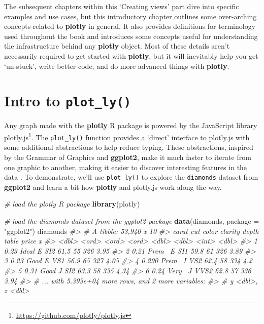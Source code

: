 \documentclass[
  12pt,
]{krantz}
\newenvironment{Shaded}{\begin{snugshade}}{\end{snugshade}}
\newcommand{\CommentTok}[1]{\textcolor[rgb]{0.56,0.35,0.01}{\textit{#1}}}
\newcommand{\DataTypeTok}[1]{\textcolor[rgb]{0.13,0.29,0.53}{#1}}
\newcommand{\KeywordTok}[1]{\textcolor[rgb]{0.13,0.29,0.53}{\textbf{#1}}}
\newcommand{\NormalTok}[1]{#1}
\newcommand{\StringTok}[1]{\textcolor[rgb]{0.31,0.60,0.02}{#1}}
\renewcommand{\href}[2]{#2\footnote{\url{#1}}}
\begin{document}
The subsequent chapters within this `Creating views' part dive into specific examples and use cases, but this introductory chapter outlines some over-arching concepts related to \textbf{plotly} in general. It also provides definitions for terminology used throughout the book and introduces some concepts useful for understanding the infrastructure behind any \textbf{plotly} object. Most of these details aren't necessarily required to get started with \textbf{plotly}, but it will inevitably help you get `un-stuck', write better code, and do more advanced things with \textbf{plotly}.

\hypertarget{intro-plotly}{%
\section{\texorpdfstring{Intro to \texttt{plot\_ly()}}{Intro to plot\_ly()}}\label{intro-plotly}}

Any graph made with the \textbf{plotly} R package is powered by the JavaScript library \href{https://github.com/plotly/plotly.js}{plotly.js}. The \texttt{plot\_ly()} function provides a `direct' interface to plotly.js with some additional abstractions to help reduce typing. These abstractions, inspired by the Grammar of Graphics and \textbf{ggplot2}, make it much faster to iterate from one graphic to another, making it easier to discover interesting features in the data \citep{Wilkinson:2005, ggplot2}. To demonstrate, we'll use \texttt{plot\_ly()} to explore the \texttt{diamonds} dataset from \textbf{ggplot2} and learn a bit how \textbf{plotly} and plotly.js work along the way.

\begin{Shaded}
\begin{Highlighting}[]
\CommentTok{# load the plotly R package}
\KeywordTok{library}\NormalTok{(plotly)}

\CommentTok{# load the diamonds dataset from the ggplot2 package}
\KeywordTok{data}\NormalTok{(diamonds, }\DataTypeTok{package =} \StringTok{"ggplot2"}\NormalTok{)}
\NormalTok{diamonds}
\CommentTok{#> # A tibble: 53,940 x 10}
\CommentTok{#>   carat cut   color clarity depth table price     x}
\CommentTok{#>   <dbl> <ord> <ord> <ord>   <dbl> <dbl> <int> <dbl>}
\CommentTok{#> 1 0.23  Ideal E     SI2      61.5    55   326  3.95}
\CommentTok{#> 2 0.21  Prem~ E     SI1      59.8    61   326  3.89}
\CommentTok{#> 3 0.23  Good  E     VS1      56.9    65   327  4.05}
\CommentTok{#> 4 0.290 Prem~ I     VS2      62.4    58   334  4.2 }
\CommentTok{#> 5 0.31  Good  J     SI2      63.3    58   335  4.34}
\CommentTok{#> 6 0.24  Very~ J     VVS2     62.8    57   336  3.94}
\CommentTok{#> # ... with 5.393e+04 more rows, and 2 more variables:}
\CommentTok{#> #   y <dbl>, z <dbl>}
\end{Highlighting}
\end{Shaded}
\end{document}
